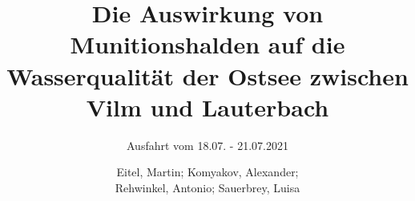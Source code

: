 \documentclass[12pt,titlepage]{scrreprt}
\begin{document}
% 
\begin{titlepage}

	

\title{Die Auswirkung von Munitionshalden auf die Wasserqualität der Ostsee zwischen Vilm und Lauterbach}
\subtitle{Ausfahrt vom 18.07. - 21.07.2021}
\titlehead{\centering\texttt{[image: Bilder/DSC05220]}}


\author{Eitel, Martin; Komyakov, Alexander; \\ Rehwinkel, Antonio; Sauerbrey, Luisa}
\publishers{Wissenschaftspate: Prof Dr. Jens Greinert \texttt{jgreinert@geomar.de} \\ Betreuer: Marek Czernohous \texttt{m.czernohous@schiller-offenburg.de}\\ - 
\\  Schiller-Gymnasium Offenburg}


\maketitle

\end{titlepage}
\tableofcontents




{}


\end{document}
